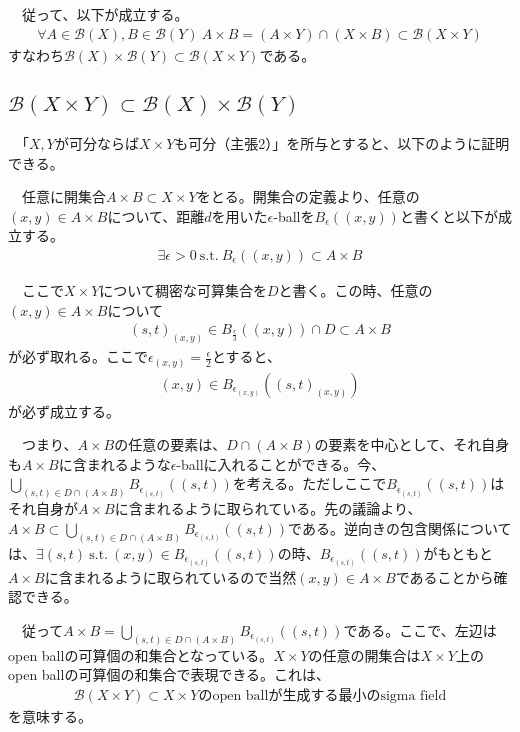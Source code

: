 \documentclass{article}
\begin{document}
　従って、以下が成立する。
\begin{align*}
	\forall A\in\mathcal{B}(X), B \in \mathcal{B}(Y)\ A\times B = (A\times Y) \cap (X\times B) \subset \mathcal{B}(X\times Y)
\end{align*}
すなわち$\mathcal{B}(X)\times\mathcal{B}(Y) \subset \mathcal{B}(X\times Y)$である。

\subsection{$\mathcal{B}(X\times Y)\subset \mathcal{B}(X)\times\mathcal{B}(Y)$}
　「$X,Y$が可分ならば$X\times Y$も可分（主張2）」を所与とすると、以下のように証明できる。

　任意に開集合$A\times B \subset X\times Y$をとる。開集合の定義より、任意の$(x,y) \in A\times B$について、距離$d$を用いた$\epsilon$-ballを$B_{\epsilon}((x,y))$と書くと以下が成立する。
\begin{align*}
	\exists \epsilon > 0\ \text{s.t.}\ B_{\epsilon}((x,y)) \subset A\times B
\end{align*}

　ここで$X\times Y$について稠密な可算集合を$D$と書く。この時、任意の$(x,y) \in A\times B$について
\begin{align*}
	(s,t)_{(x,y)} \in B_{\frac{\epsilon}{3}}((x,y)) \cap D \subset A\times B
\end{align*}
が必ず取れる。ここで$\epsilon_{(x,y)} = \frac{\epsilon}{2}$とすると、
\begin{align*}
	(x,y) \in B_{\epsilon_{(x,y)}}((s,t)_{(x,y)})
\end{align*}
が必ず成立する。

　つまり、$A\times B$の任意の要素は、$D\cap (A\times B)$の要素を中心として、それ自身も$A\times B$に含まれるような$\epsilon$-ballに入れることができる。今、$\bigcup_{(s,t)\in D\cap(A\times B)} B_{\epsilon_{(s,t)}}((s,t))$を考える。ただしここで$B_{\epsilon_{(s,t)}}((s,t))$はそれ自身が$A\times B$に含まれるように取られている。先の議論より、$A\times B \subset \bigcup_{(s,t)\in D\cap(A\times B)} B_{\epsilon_{(s,t)}}((s,t))$である。逆向きの包含関係については、$\exists (s,t)\ \text{s.t.}\ (x, y)\in B_{\epsilon_{(s,t)}}((s,t))$の時、$B_{\epsilon_{(s,t)}}((s,t))$がもともと$A\times B$に含まれるように取られているので当然$(x, y)\in A\times B$であることから確認できる。

　従って$A\times B = \bigcup_{(s,t)\in D\cap(A\times B)} B_{\epsilon_{(s,t)}}((s,t))$である。ここで、左辺はopen ballの可算個の和集合となっている。$X\times Y$の任意の開集合は$X\times Y$上のopen ballの可算個の和集合で表現できる。これは、
\begin{align*}
\mathcal{B}(X\times Y) \subset \text{$X\times Y$のopen ballが生成する最小のsigma field}
\end{align*}
を意味する。
\end{document}
